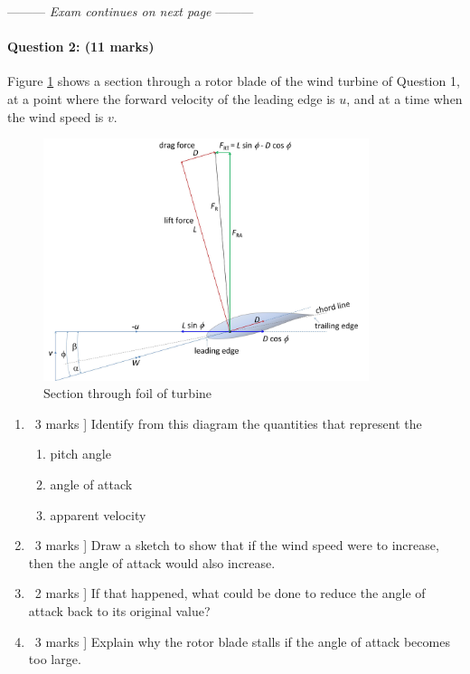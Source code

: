 \documentclass[a4paper,12pt,fleqn]{article}
\newcommand{\middlewords}{Exam continues on next page}
\begin{document}
\begin{center}
\vspace{3cm}
--------- \textit{\middlewords} ---------
\end{center}
\newpage

\paragraph{\textbf{Question 2: (11 marks)}}
Figure \ref{figure:q2} shows a section through a rotor blade of the wind turbine of Question 1, at a point where the forward velocity
 of the leading edge is $u$, and at a time when the wind speed is $v$.
\begin{figure}
\centering
\includegraphics[width=0.85\textwidth]{./figures/vectors}
\caption{Section through foil of turbine}
\label{figure:q2}
\end{figure}

\begin{enumerate} [label=\alph*)]
\item \lbrack\ 3 marks ] Identify from this diagram the quantities that represent the 
    \begin{enumerate} [label=\roman*)]
        \item pitch angle
        \item angle of attack
        \item apparent velocity
    \end{enumerate}
\item \lbrack\ 3 marks ] Draw a sketch to show that if the wind speed were to increase, then the angle of attack would also increase.
\item \lbrack\ 2 marks ] If that happened, what could be done to reduce the angle of attack back to its original value?
\item \lbrack\ 3 marks ] Explain why the rotor blade stalls if the angle of attack becomes too large.
\end{enumerate}
\end{document}
